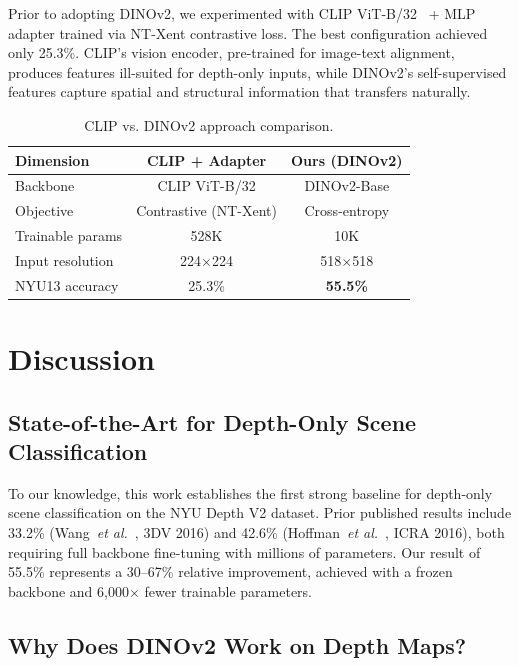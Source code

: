 \documentclass[conference, a4paper]{IEEEtran}
\begin{document}
Prior to adopting DINOv2, we experimented with CLIP ViT-B/32~\cite{clip} + MLP adapter
trained via NT-Xent contrastive loss. The best configuration achieved only 25.3\%.
CLIP's vision encoder, pre-trained for image-text alignment, produces features ill-suited
for depth-only inputs, while DINOv2's self-supervised features capture spatial and
structural information that transfers naturally.

\begin{table}[htb]
    \centering
    \caption{CLIP vs. DINOv2 approach comparison.}
    \label{tab:comparison}
    \footnotesize
    \begin{tabular}{lcc}
        \toprule
        \textbf{Dimension} & \textbf{CLIP + Adapter} & \textbf{Ours (DINOv2)} \\
        \midrule
        Backbone & CLIP ViT-B/32 & DINOv2-Base \\
        Objective & Contrastive (NT-Xent) & Cross-entropy \\
        Trainable params & 528K & 10K \\
        Input resolution & 224$\times$224 & 518$\times$518 \\
        NYU13 accuracy & 25.3\% & \textbf{55.5\%} \\
        \bottomrule
    \end{tabular}
\end{table}

\section{Discussion}

\subsection{State-of-the-Art for Depth-Only Scene Classification}

To our knowledge, this work establishes the first strong baseline for depth-only scene
classification on the NYU Depth V2 dataset. Prior published results include
33.2\% (Wang~\textit{et al.}~\cite{wang3d}, 3DV 2016) and 42.6\%
(Hoffman~\textit{et al.}~\cite{hoffman2016}, ICRA 2016), both requiring full
backbone fine-tuning with millions of parameters. Our result of 55.5\%
represents a 30--67\% relative improvement, achieved with a frozen backbone
and 6,000$\times$ fewer trainable parameters.

\subsection{Why Does DINOv2 Work on Depth Maps?}
\end{document}
